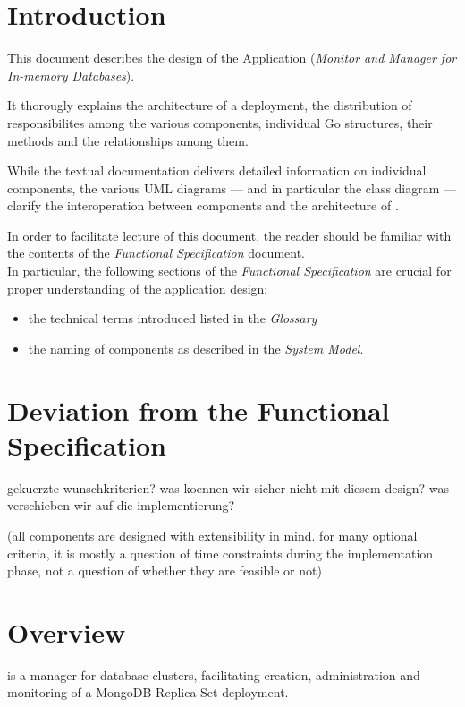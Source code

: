 \section{Introduction}

This document describes the design of the Application \mamid (\emph{Monitor and Manager for In-memory Databases}).

It thorougly explains the architecture of a \mamid deployment, the distribution of responsibilites among the various components,
individual Go structures, their methods and the relationships among them.

While the textual documentation delivers detailed information on individual components, the various UML diagrams
--- and in particular the class diagram --- clarify the interoperation between components and the architecture of \mamid.

In order to facilitate lecture of this document, the reader should be familiar with the contents of the \emph{Functional Specification}
document.\\
In particular, the following sections of the \emph{Functional Specification} are crucial for proper understanding of the
application design:
\begin{itemize}
  \item the technical terms introduced listed in the \emph{Glossary}
  \item the naming of \mamid components as described in the \emph{System Model}.
\end{itemize}

\section{Deviation from the Functional Specification}


gekuerzte wunschkriterien? was koennen wir sicher nicht mit diesem design? was verschieben wir auf die implementierung?

(all components are designed with extensibility in mind. for many optional criteria, it is mostly a question of time constraints during the implementation phase, not a question of whether they are feasible or not)

\section{Overview}

\mamid is a manager for database clusters, facilitating creation, administration and monitoring of a MongoDB Replica Set deployment.

